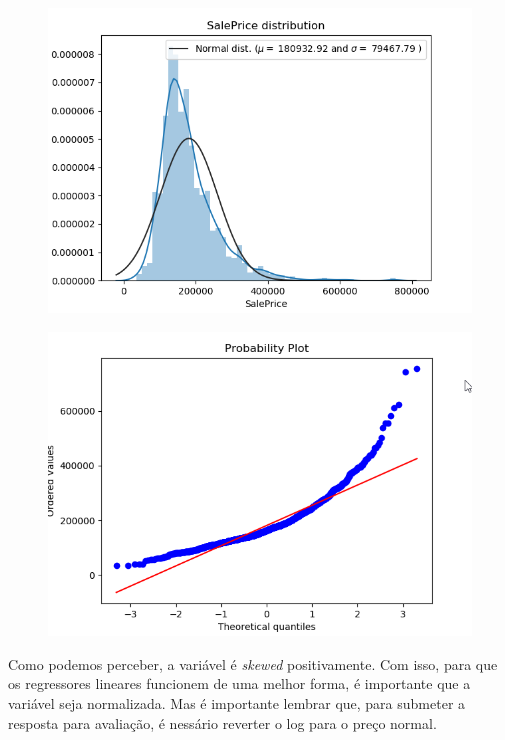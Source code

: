 \begin{figure}[H]
	\centering
	\includegraphics[keepaspectratio,width=1\textwidth]{img/saleprice-normalizado.png}
\end{figure}

\begin{figure}[H]
	\centering
	\includegraphics[keepaspectratio,width=1\textwidth]{img/saleprice-prob.png}
\end{figure}

Como podemos perceber, a variável é \textit{skewed} positivamente. Com isso, para que os regressores lineares funcionem de uma melhor forma, é importante que a variável seja normalizada. Mas é importante lembrar que, para submeter a resposta para avaliação, é nessário reverter o log para o preço normal.


